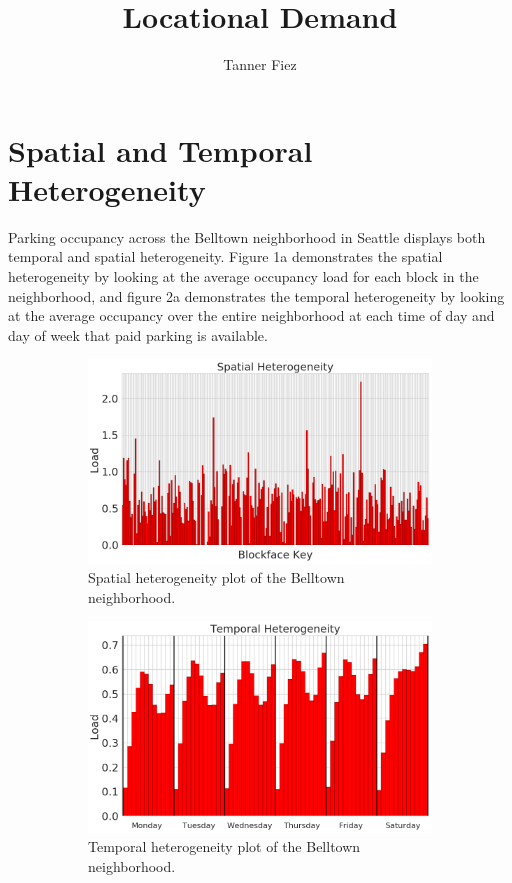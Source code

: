 \documentclass{article}
\begin{document}
\title{Locational Demand}
\author{Tanner Fiez}
\date{}
\maketitle

\section{Spatial and Temporal Heterogeneity}
Parking occupancy across the Belltown neighborhood in Seattle displays both temporal and spatial heterogeneity. Figure 1a demonstrates the spatial heterogeneity by looking at the average occupancy load for each block in the neighborhood, and figure 2a demonstrates the temporal heterogeneity by looking at the average occupancy over the entire neighborhood at each time of day and day of week that paid parking is available.

\begin{figure}[H]
\begin{subfigure}[t]{0.45\textwidth}
\centering
\includegraphics[width=.99\textwidth]{../figs/spatial_heterogeneity.png}
\caption{Spatial heterogeneity plot of the Belltown neighborhood.}
\label{fig:subim1}
\end{subfigure}\hfill
\begin{subfigure}[t]{0.45\textwidth}
\centering
\includegraphics[width=.99\textwidth]{../figs/temporal_heterogeneity.png}
\caption{Temporal heterogeneity plot of the Belltown neighborhood.}
\label{fig:subim2}
\end{subfigure}
\caption{}
\label{fig:image2}
\end{figure}
\end{document}
